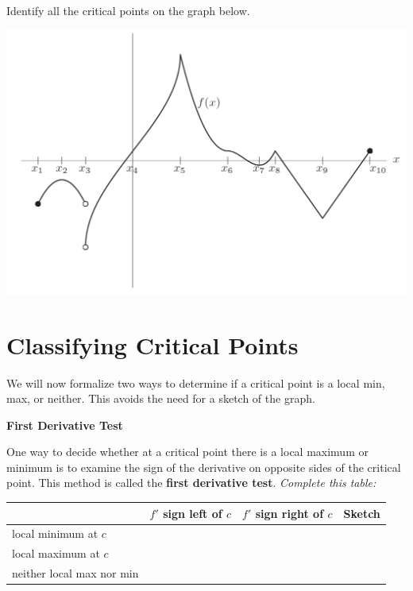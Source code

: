 \newpage


\problem Identify all the critical points on the graph below.

\includegraphics[width=8in]{graphics/notes03_crit_pnt_oddities}

\newpage


\section*{Classifying Critical Points}

We will now formalize two ways to determine if a critical point is a
local min, max, or neither. This avoids the need for a sketch of the
graph.

\begin{boxnote}
{\bf First Derivative Test}

One way to decide whether at a critical point there is a local maximum
or minimum is to examine the sign of the derivative on opposite sides
of the critical point.  This method is called the {\bf{first
    derivative test}}.  {\em{Complete this table:}}

\vspace{1mm}
\begin{center}
\begin{tabular}{|l|c|c|p{1in}|} \hline
\qquad \qquad \qquad \qquad \qquad &  $f'$ sign left of $c$ & $f'$ sign right of $c$ & Sketch\hspace{0.5in}  \\ \hline
local minimum at $c$ & & &\\[1.0in] \hline
local maximum at $c$ & & &\\[1.0in] \hline
neither local max nor min & & &\\[1.0in] \hline
\end{tabular}
\end{center}

\vspace{1.5mm}

\end{boxnote}

